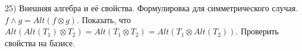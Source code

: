 25) Внешняя алгебра и её свойства. Формулировка для симметрического случая.\\
$f \wedge g = Alt(f \otimes g)$. Показать, что $Alt(Alt(T_1) \otimes T_2) = Alt(T_1 \otimes T_2) = Alt(T_1 \otimes Alt(T_2))$. Проверить свойства на базисе.\\
